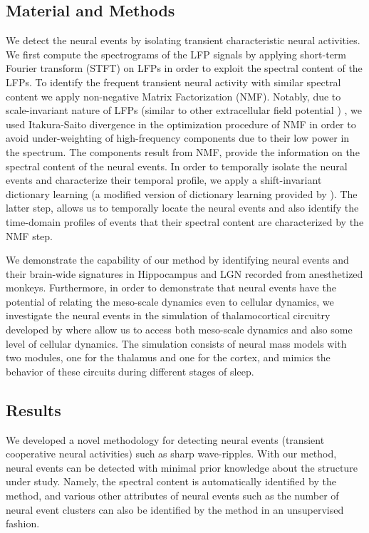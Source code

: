 \subsection*{Material and Methods}
We detect the neural events by isolating transient characteristic neural activities.
We first compute the spectrograms of the LFP signals by applying short-term Fourier transform (STFT) on LFPs in order to exploit the spectral content of the LFPs.
To identify the frequent transient neural activity with similar spectral content we apply non-negative Matrix Factorization (NMF).
Notably, due to scale-invariant nature of LFPs (similar to other extracellular field potential \cite{buzsakiOriginExtracellularFields2012}) \cite{freemanScalefreeNeocorticalDynamics2007a,heScalefreeBrainActivity2014},
we used Itakura-Saito divergence in the optimization procedure of NMF \cite{fevotteNonnegativeMatrixFactorization2009}
in order to avoid under-weighting of high-frequency components due to their low power in the spectrum.
The components result from NMF, provide the information on the spectral content of the neural events.
In order to temporally isolate the neural events and characterize their temporal profile, 
we apply a shift-invariant dictionary learning
(a modified version of dictionary learning provided by \citet{mailheShiftinvariantDictionaryLearning2008a}).
The latter step, allows us to temporally locate the neural events and also identify the time-domain profiles of events that their spectral content are characterized by the NMF step.

We demonstrate the capability of our method by identifying neural events and their brain-wide signatures in Hippocampus and LGN recorded from anesthetized monkeys.
Furthermore, in order to demonstrate that neural events have the potential of  relating the meso-scale dynamics even to cellular dynamics,
we investigate the neural events in the simulation of thalamocortical circuitry  developed by \citet{costaThalamocorticalNeuralMass2016} where allow us to access both meso-scale dynamics and also some level of cellular dynamics.
The simulation consists of neural mass models with two modules,
one for the thalamus and one for the cortex, and mimics the behavior of these circuits during different stages of sleep.

\subsection*{Results}
We developed a novel methodology for detecting neural events (transient cooperative neural activities) such as sharp wave-ripples.
With our method, neural events can be detected with minimal prior knowledge about the structure under study.
Namely, the spectral content is automatically identified by the method,
and various other attributes of neural events such as the number of neural event clusters  can also be identified by the method in an unsupervised fashion.

